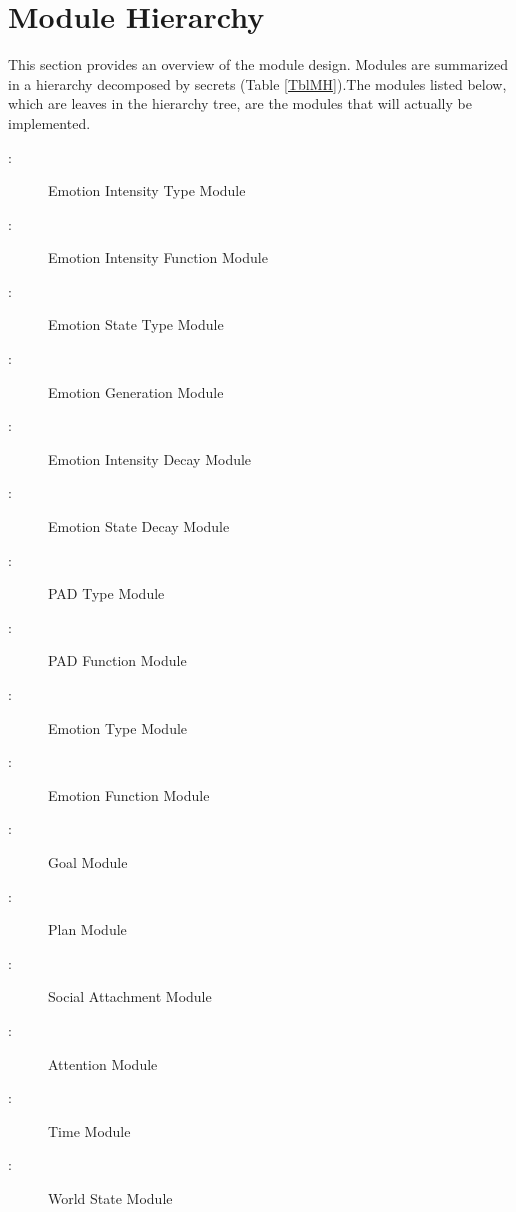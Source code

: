 \section{Module Hierarchy}\label{SecMH}
This section provides an overview of the module design. Modules are summarized
in a hierarchy decomposed by secrets (Table \ref{TblMH}).The modules listed
below, which are leaves in the hierarchy tree, are the modules that will
actually be implemented.

\begin{description}

    \item [ \mthemnum \label{mIntensity}:] Emotion
    Intensity Type Module

    \item [ \mthemnum \label{mIntensityFun}:] Emotion
    Intensity Function Module

    \item [ \mthemnum \label{mStateType}:] Emotion State
    Type Module

    \item [ \mthemnum \label{mGenerate}:] Emotion
    Generation Module

    \item [ \mthemnum \label{mDecay}:] Emotion Intensity
    Decay Module

    \item [ \mthemnum \label{mDecayState}:] Emotion State
    Decay Module

    \item [ \mthemnum \label{mPADType}:] PAD Type Module

    \item [ \mthemnum \label{mPADFun}:] PAD Function Module

    \item [ \mthemnum \label{mEmotionType}:] Emotion Type
    Module

    \item [ \mthemnum \label{mEmotionFun}:] Emotion
    Function Module

    \item [ \mthemnum \label{mGoal}:] Goal Module

    \item [ \mthemnum \label{mPlan}:] Plan Module

    \item [ \mthemnum \label{mSocial}:] Social Attachment
    Module

    \item [ \mthemnum \label{mAttention}:] Attention Module

    \item [ \mthemnum \label{mTime}:] Time Module

    \item [ \mthemnum \label{mWorld}:] World State Module

\end{description}

